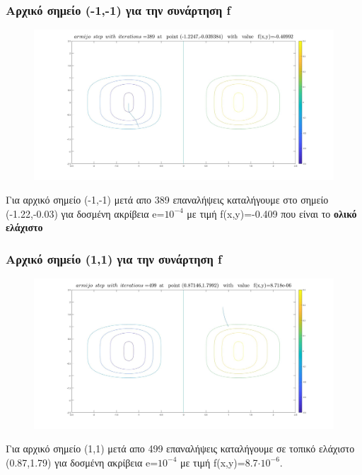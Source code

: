 \documentclass{article}
\begin{document}
\subsubsection*{Αρχικό σημείο (-1,-1) για την συνάρτηση f}
\begin{figure}[h!]	
     \centering  
     \advance\leftskip-0.2cm  
  \includegraphics[width=130mm,scale=2]{arm2.jpg}
\end{figure} 
Για αρχικό σημείο (-1,-1) μετά απο 389 επαναλήψεις καταλήγουμε στο σημείο (-1.22,-0.03) για  δοσμένη ακρίβεια e=$10^{-4}$ με τιμή f(x,y)=-0.409 που είναι  το \textbf{ολικό ελάχιστο}
\clearpage
\subsubsection*{Αρχικό σημείο (1,1) για την συνάρτηση f}
\begin{figure}[h!]	
     \centering  
     \advance\leftskip-0.2cm  
  \includegraphics[width=130mm,scale=2]{arm3.jpg}
\end{figure} 
Για αρχικό σημείο (1,1) μετά απο 499 επαναλήψεις καταλήγουμε σε τοπικό ελάχιστο (0.87,1.79) για δοσμένη ακρίβεια e=$10^{-4}$ με τιμή f(x,y)=8.7$\cdot 10^{-6}$. 
\newpage
\end{document}
